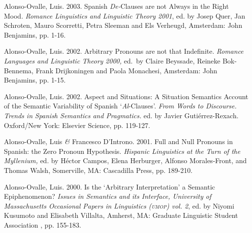 \documentclass[11pt]{article}
\begin{document}
Alonso-Ovalle, Luis. 2003. Spanish {\it De-}Clauses are not Always in the Right Mood. {\it Romance Linguistics and Linguistic Theory 2001}, ed. by Josep Quer, Jan Schroten, Mauro Scorretti, Petra Sleeman and Els Verheugd, Amsterdam: John Benjamins, pp. 1-16. 

Alonso-Ovalle, Luis. 2002. Arbitrary Pronouns are not that Indefinite.  {\it Romance Languages and Linguistic Theory 2000,} ed.\ by Claire Beyssade, Reineke Bok-Bennema, Frank Drijkoningen and Paola Monachesi, Amsterdam: John Benjamins, pp. 1-15. 

Alonso-Ovalle, Luis. 2002. Aspect and Situations: A Situation Semantics Account of the Semantic Variability of Spanish `\emph{Al}-Clauses'. \textit{From Words to Discourse. Trends in Spanish Semantics and Pragmatics.} ed. by Javier Guti\'errez-Rexach. Oxford/New York: Elsevier Science, pp. 119-127. 

Alonso-Ovalle, Luis \textit{\&} Francesco D'Introno. 2001. Full and Null Pronouns in Spanish: the Zero Pronoun Hypothesis. \textit{Hispanic Linguistics at the Turn of the Myllenium,} ed. by H\'ector Campos, Elena Herburger, Alfonso Morales-Front, and Thomas Walsh, Somerville, MA: Cascadilla Press, pp. 189-210.

Alonso-Ovalle, Luis. 2000. Is the `Arbitrary Interpretation' a Semantic Epiphenomenon? {\it Issues in Semantics and its Interface, University of Massachusetts Occasional Papers in Linguistics (\textsc{umop}) vol. 2}, ed. by  Niyomi Kusumoto and Elisabeth Villalta, Amherst, MA: Graduate Linguistic Student Association , pp. 155-183. 
\end{document}
